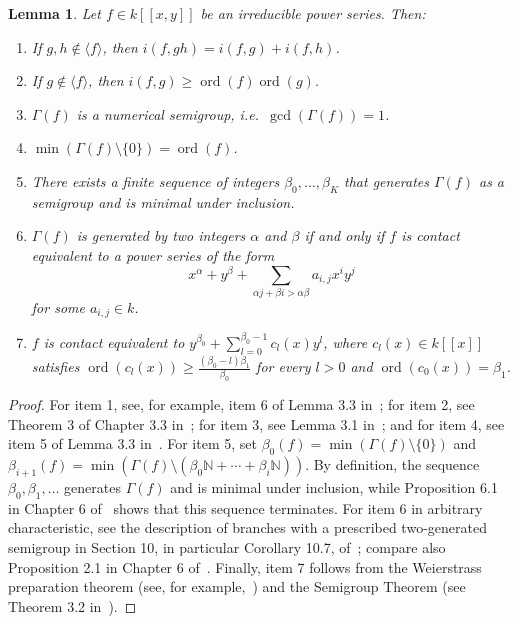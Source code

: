 \documentclass{article}
\newtheorem{lemma}[theorem]{Lemma}
\DeclareMathOperator{\ord}{ord}
\numberwithin{theorem}{section}
\begin{document}
\begin{lemma}\label{lem:semi_prope}
Let $f\in k[[x,y]]$ be an irreducible power series. Then:
\begin{enumerate}
    \item If $g,h\notin\langle f\rangle$, then $i(f,gh)=i(f,g)+i(f,h)$.
    \item If $g\notin\langle f\rangle$, then $i(f,g)\geq\ord(f)\ord(g)$.
    \item $\Gamma(f)$ is a numerical semigroup, i.e.\ $\gcd(\Gamma(f))=1$.
    \item $\min(\Gamma(f)\setminus\{0\})=\ord(f)$.
    \item There exists a finite sequence of integers $\beta_0,\dots,\beta_K$ that generates $\Gamma(f)$ as a semigroup and is minimal under inclusion.
    \item $\Gamma(f)$ is generated by two integers $\alpha$ and $\beta$ if and only if $f$ is contact equivalent to a power series of the form
    \[
        x^\alpha+y^\beta+
        \sum_{\alpha j+\beta i>\alpha\beta}a_{i,j}x^iy^j
    \]
    for some $a_{i,j}\in k$.
    \item $f$ is contact equivalent to $y^{\beta_0}+\sum_{l=0}^{\beta_0-1}c_l(x)y^l$, where $c_l(x)\in k[[x]]$ satisfies $\ord(c_l(x))\geq\frac{(\beta_0-l)\beta_1}{\beta_0}$ for every $l>0$ and $\ord(c_0(x))=\beta_1$.
\end{enumerate}
\end{lemma}

\begin{proof}
For item 1, see, for example, item 6 of Lemma 3.3 in~\cite{svoray2026Milnor}; for item 2, see Theorem 3 of Chapter 3.3 in~\cite{fulton2008algebraic}; for item 3, see Lemma 3.1 in~\cite{barroso2012approach}; and for item 4, see item 5 of Lemma 3.3 in~\cite{svoray2026Milnor}. For item 5, set $\beta_0(f)=\min(\Gamma(f)\setminus\{0\})$ and $\beta_{i+1}(f)=\min(\Gamma(f)\setminus(\beta_0\mathbb{N}+\cdots+\beta_i\mathbb{N}))$. By definition, the sequence $\beta_0,\beta_1,\dots$ generates $\Gamma(f)$ and is minimal under inclusion, while Proposition 6.1 in Chapter 6 of~\cite{hefez2003irreducible} shows that this sequence terminates. For item 6 in arbitrary characteristic, see the description of branches with a prescribed two-generated semigroup in Section 10, in particular Corollary 10.7, of~\cite{barroso2012approach}; compare also Proposition 2.1 in Chapter 6 of~\cite{zariski2006moduli}. Finally, item 7 follows from the Weierstrass  preparation theorem (see, for example,~\cite{o1972weierstrass}) and the Semigroup Theorem (see Theorem 3.2 in~\cite{barroso2012approach}).
\end{proof}
\end{document}
